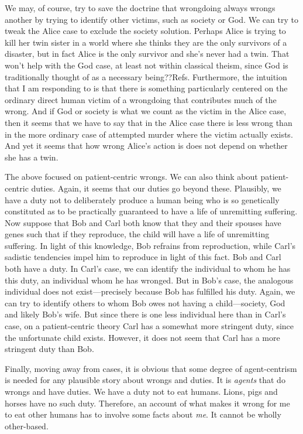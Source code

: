 We may, of course, try to save the doctrine that wrongdoing always wrongs another by trying to identify other victims, such as 
society or God. We can try to tweak the Alice case to exclude the society solution. Perhaps Alice is trying to kill her twin sister
in a world where she thinks they are the only survivors of a disaster, but in fact Alice is the only survivor and she's never had a
twin. That won't help with the God case, at least not within classical theism, since God is traditionally thought of as a necessary 
being??Refs. Furthermore, the intuition that I am responding to is that there is something particularly centered
on the ordinary direct human victim of a wrongdoing that contributes much of the wrong. And if God or society is what we count as 
the victim in the Alice case, then it seems that we have to say that in the Alice case there is less wrong than in the more ordinary
case of attempted murder where the victim actually exists. And yet it seems that how wrong Alice's action is does not depend on whether
she has a twin.

The above focused on patient-centric wrongs. We can also think about patient-centric duties. Again, it seems that our duties go 
beyond these. Plausibly, we have a duty not to deliberately produce a human being who is so genetically constituted as to be 
practically guaranteed to have a life of unremitting suffering. Now suppose that Bob and Carl both know that they and their 
spouses have genes such that if they reproduce, the child will have a life of unremitting suffering. In light of this knowledge,
Bob refrains from reproduction, while Carl's sadistic tendencies impel him to reproduce in light of this fact. Bob and Carl both
have a duty. In Carl's case, we can identify the individual to whom he has this duty, an individual whom he has wronged.
But in Bob's case, the analogous individual does not exist---precisely because Bob has fulfilled his duty. Again, we can try to
identify others to whom Bob owes not having a child---society, God and likely Bob's wife. But since there is one less individual
here than in Carl's case, on a patient-centric theory Carl has a somewhat more stringent duty, since the unfortunate child exists. However, it does not seem
that Carl has a more stringent duty than Bob.

Finally, moving away from cases, it is obvious that some degree of agent-centrism is needed for any plausible story about wrongs 
and duties. It is \textit{agents} that do wrongs and have duties. We have a duty not to eat humans. Lions, pigs and horses have no 
such  duty. Therefore, an account of what makes it wrong for me to eat other humans has to involve some facts about \textit{me}.
It cannot be wholly other-based. 

